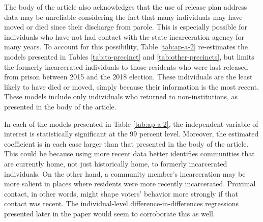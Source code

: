 \documentclass[
  12pt,
]{article}
\begin{document}
The body of the article also acknowledges that the use of release plan address data may be unreliable considering the fact that many individuals may have moved or died since their discharge from parole. This is especially possible for individuals who have not had contact with the state incarceration agency for many years. To account for this possibility, Table \ref{tab:ap-a-2} re-estimates the models presented in Tables \ref{tab:to-precinct} and \ref{tab:other-precincts}, but limits the formerly incarcerated individuals to those residents who were last released from prison between 2015 and the 2018 election. These individuals are the least likely to have died or moved, simply because their information is the most recent. These models include only individuals who returned to non-institutions, as presented in the body of the article.

\begin{singlespace}


\end{singlespace}

In each of the models presented in Table \ref{tab:ap-a-2}, the independent variable of interest is statistically significant at the 99 percent level. Moreover, the estimated coefficient is in each case larger than that presented in the body of the article. This could be because using more recent data better identifies communities that are currently home, not just historically home, to formerly incarcerated individuals. On the other hand, a community member's incarceration may be more salient in places where residents were more recently incarcerated. Proximal contact, in other words, might shape voters' behavior more strongly if that contact was recent. The individual-level difference-in-differences regressions presented later in the paper would seem to corroborate this as well.
\end{document}
